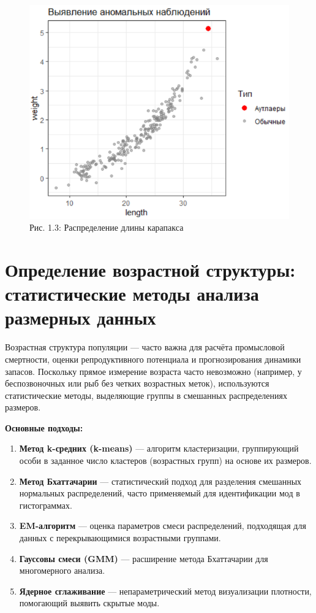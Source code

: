 \documentclass[
  letterpaper,
  DIV=11,
  numbers=noendperiod]{scrreprt}
\begin{document}
\begin{figure}[H]

{\centering \includegraphics[width=0.6\linewidth,height=\textheight,keepaspectratio]{images/outliers_shrimp.PNG}

}

\caption{Рис. 1.3: Распределение длины карапакса}

\end{figure}%

\section{Определение возрастной структуры: статистические методы анализа
размерных
данных}\label{ux43eux43fux440ux435ux434ux435ux43bux435ux43dux438ux435-ux432ux43eux437ux440ux430ux441ux442ux43dux43eux439-ux441ux442ux440ux443ux43aux442ux443ux440ux44b-ux441ux442ux430ux442ux438ux441ux442ux438ux447ux435ux441ux43aux438ux435-ux43cux435ux442ux43eux434ux44b-ux430ux43dux430ux43bux438ux437ux430-ux440ux430ux437ux43cux435ux440ux43dux44bux445-ux434ux430ux43dux43dux44bux445}

Возрастная структура популяции --- часто важна для расчёта промысловой
смертности, оценки репродуктивного потенциала и прогнозирования динамики
запасов. Поскольку прямое измерение возраста часто невозможно (например,
у беспозвоночных или рыб без четких возрастных меток), используются
статистические методы, выделяющие группы в смешанных распределениях
размеров.

\textbf{Основные подходы:}

\begin{enumerate}
\def\labelenumi{\arabic{enumi}.}
\item
  \textbf{Метод k-средних (k-means)} --- алгоритм кластеризации,
  группирующий особи в заданное число кластеров (возрастных групп) на
  основе их размеров.
\item
  \textbf{Метод Бхаттачарии} --- статистический подход для разделения
  смешанных нормальных распределений, часто применяемый для
  идентификации мод в гистограммах.
\item
  \textbf{EM-алгоритм} --- оценка параметров смеси распределений,
  подходящая для данных с перекрывающимися возрастными группами.
\item
  \textbf{Гауссовы смеси (GMM)} --- расширение метода Бхаттачарии для
  многомерного анализа.
\item
  \textbf{Ядерное сглаживание} --- непараметрический метод визуализации
  плотности, помогающий выявить скрытые моды.
\end{enumerate}
\end{document}
